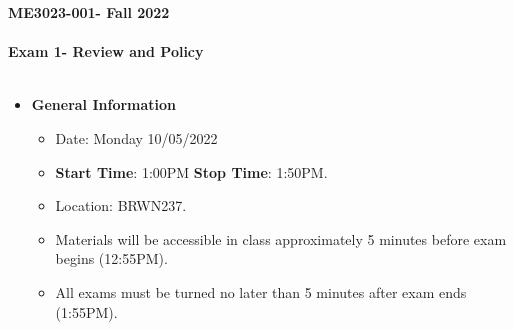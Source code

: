 \documentclass[11pt]{article}
\newcommand{\EXAMNUM}{1\hspace{0mm}}
\newcommand{\SECNUM}{001\hspace{0mm}}
\begin{document}
\textbf{ \LARGE ME3023-\SECNUM - Fall 2022} \\\\
\textbf{ \LARGE \hspace*{5mm} Exam \EXAMNUM \hspace{2mm}- Review and Policy } \\\\

\begin{itemize}
	\item  \textbf{\Large General Information}

	\begin{itemize}

		\item Date: Monday 10/05/2022
		\item {\bf Start Time}: 1:00PM {\bf Stop Time}: 1:50PM.
		\item Location: BRWN237. 
		 
		\item Materials will be accessible in class approximately 5 minutes before exam begins (12:55PM).
		\item All exams must be turned no later than 5 minutes after exam ends (1:55PM). \vspace{1mm}\\
		
	\end{itemize}


\end{itemize}
\end{document}
